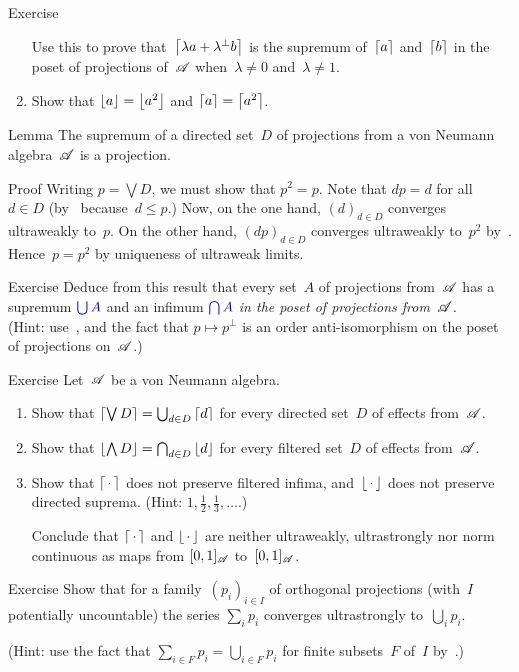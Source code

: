 \documentclass[a]{subfiles}
\begin{document}
\begin{parsec}
\begin{point}{Exercise}
\begin{enumerate}
Use this to prove that~$\left\lceil\lambda a+\lambda^\perp b\right\rceil$
is the supremum of~$\left\lceil a\right\rceil$ and~$\left\lceil b\right\rceil$
in the poset of projections of~$\mathscr{A}$
when~$\lambda\neq 0$ and~$\lambda\neq 1$.
\item
Show that $\left\lfloor a\right\rfloor=\left\lfloor a^2\right\rfloor$
and $\left\lceil a\right\rceil=\left\lceil a^2\right\rceil$.
\end{enumerate}
\end{point}
\begin{point}{Lemma}%
The supremum of a directed set~$D$ of projections
from a von Neumann algebra~$\mathscr{A}$ is a projection.
\begin{point}{Proof}%
Writing $p=\bigvee D$,
we must show that $p^2=p$.
Note that $dp=d$ for all~$d\in D$
(by~ because~$d\leq p$.)
Now, on the one hand, $(d)_{d\in D}$
converges ultraweakly to~$p$.
On the other hand,
$(dp)_{d\in D}$
converges ultraweakly to~$p^2$ by~.
Hence~$p=p^2$ by uniqueness of ultraweak limits.
\end{point}
\end{point}
\begin{point}{Exercise}%
Deduce from this result
 that every set~$A$ of projections from~$\mathscr{A}$
has a supremum $\Define{\bigcup A}$
and an infimum $\Define{\bigcap A}$
\emph{in the poset of projections from~$\mathscr{A}$}.\\
(Hint: use~,
and the fact that $p\mapsto p^\perp$ 
is an order anti-isomorphism on the poset of projections on~$\mathscr{A}$.)
\end{point}
\begin{point}{Exercise}
Let~$\mathscr{A}$ be a von Neumann algebra.
\begin{enumerate}
\item
Show that $\left\lceil\bigvee D\right\rceil=\bigcup_{d\in D} \left\lceil d\right\rceil$
for every directed set~$D$ of effects from~$\mathscr{A}$.
\item
Show that $\left\lfloor\bigwedge D\right\rfloor = \bigcap_{d\in D} \left\lfloor d\right\rfloor$
for every filtered set~$D$ of effects from~$\mathscr{A}$.
\item
Show that $\left\lceil\,\cdot\,\right\rceil$
does not preserve filtered infima,
and~$\left\lfloor\,\cdot\,\right\rfloor$
does not preserve directed suprema.
(Hint: $1,\frac{1}{2},\frac{1}{3},\dotsc$.)

Conclude that $\left\lceil\,\cdot\,\right\rceil$
and $\left\lfloor\,\cdot\,\right\rfloor$
are neither ultraweakly, ultrastrongly nor norm  continuous
as maps from $[0,1]_{\mathscr{A}}$ to~$[0,1]_{\mathscr{A}}$.
\end{enumerate}
\end{point}
\begin{point}{Exercise}%
Show that for a family~$(p_i)_{i\in I}$ 
of orthogonal projections
(with~$I$ potentially uncountable)
the series $\sum_i p_i$
converges ultrastrongly to~$\bigcup_i p_i$.

(Hint: 
use the fact that $\sum_{i\in F} p_i = \bigcup_{i \in F} p_i$
for finite subsets~$F$ of~$I$ by~.)
\end{point}
\end{parsec}
\end{document}
